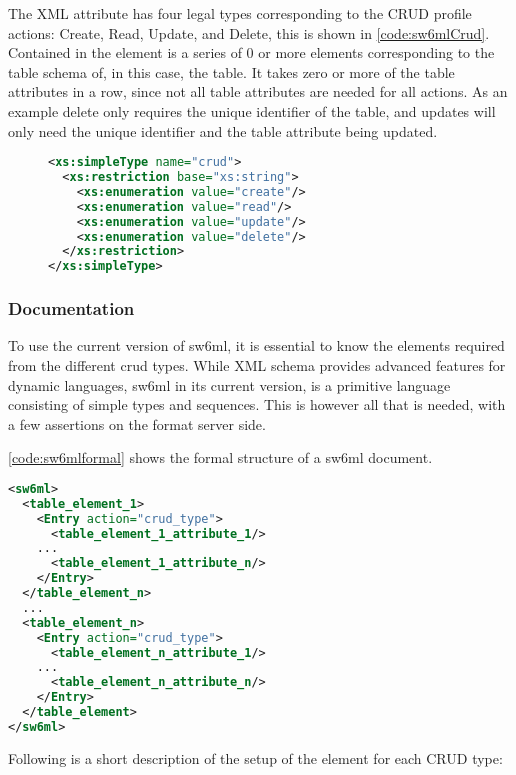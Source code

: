 The  XML attribute has four legal types corresponding to the CRUD profile actions: Create, Read, Update, and Delete, this is shown in \autoref{code:sw6mlCrud}.
Contained in the  element is a series of 0 or more elements corresponding to the table schema of, in this case, the  table.
It takes zero or more of the table attributes in a row, since not all table attributes are needed for all actions. As an example delete only requires the unique identifier of the table, and
updates will only need the unique identifier and the table attribute being updated.
\begin{figure}[H]
\begin{lstlisting}[label=code:sw6mlCrud,language=XML,caption=sw6ml crud simple type]
 <xs:simpleType name="crud">
  <xs:restriction base="xs:string">
    <xs:enumeration value="create"/>
    <xs:enumeration value="read"/>
    <xs:enumeration value="update"/>
    <xs:enumeration value="delete"/>
  </xs:restriction>
</xs:simpleType>
\end{lstlisting}
\end{figure}

\subsubsection{Documentation}
\label{sw6mlusage}
To use the current version of sw6ml, it is essential to know the elements required from the different crud types.
While XML schema provides advanced features for dynamic languages, sw6ml in its current version, is a primitive language consisting of simple types and sequences.
This is however all that is needed, with a few assertions on the format server side.

\autoref{code:sw6mlformal} shows the formal structure of a sw6ml document.
\begin{Code}
\begin{lstlisting}[label=code:sw6mlformal,language=XML,caption=Root and table elements]
<sw6ml> 
  <table_element_1>
    <Entry action="crud_type">
      <table_element_1_attribute_1/>
	...
      <table_element_1_attribute_n/>
    </Entry>
  </table_element_n>
  ...
  <table_element_n>
    <Entry action="crud_type">
      <table_element_n_attribute_1/>
	...
      <table_element_n_attribute_n/>
    </Entry>
  </table_element>
</sw6ml>
\end{lstlisting}
\end{Code}

Following is a short description of the setup of the  element for each CRUD type:

